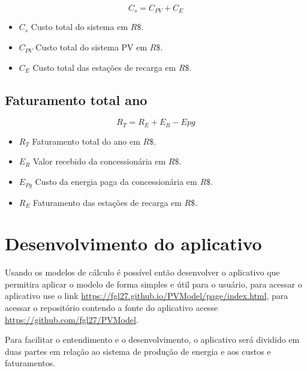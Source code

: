 \begin{equation}
    C_{s} = C_{PV} + C_{E}
    \label{eq:EV_custo}
\end{equation}

\begin{itemize}
  \item $C_{s}$ Custo total do sistema em $R\$$.

  \item $C_{PV}$ Custo total do sistema PV em $R\$$.

  \item $C_{E}$ Custo total das estações de recarga em $R\$$.

\end{itemize}

\subsection{Faturamento total ano}

\begin{equation}
    R_{T} =  R_{E} + E_{R} - E{pg}
    \label{eq:EV_custo}
\end{equation}

\begin{itemize}
  \item $R_{T}$ Faturamento total do ano em $R\$$.

  \item $E_{R}$ Valor recebido da concessionária em $R\$$.

  \item $E_{Pg}$ Custo da energia paga da concessionária em $R\$$.
  
  \item $R_{E}$ Faturamento das estações de recarga em $R\$$.

\end{itemize}

\section{Desenvolvimento do aplicativo}

Usando os modelos de cálculo é possível então desenvolver o aplicativo que permitira aplicar o modelo de forma simples e útil para o usuário, para acessar o aplicativo use o link \url{https://fgl27.github.io/PVModel/page/index.html}, para acessar o repositório contendo a fonte do aplicativo acesse \url{ https://github.com/fgl27/PVModel}.

Para facilitar o entendimento e o desenvolvimento, o aplicativo será dividido em duas partes em relação ao sistema de produção de energia e aos custos e faturamentos.

